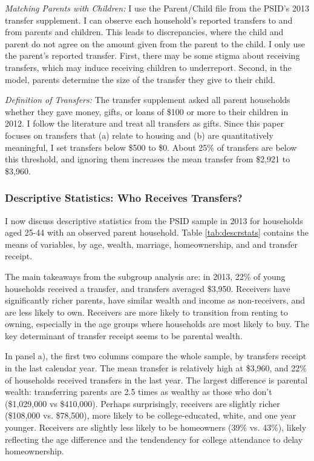\documentclass[12pt]{article}
\begin{document}
\textit{Matching Parents with Children:} I use the Parent/Child file from the PSID's 2013 transfer supplement. I can observe each household's reported transfers to and from parents and children. This leads to discrepancies, where the child and parent do not agree on the amount given from the parent to the child. I only use the parent's reported transfer. First, there may be some stigma about receiving transfers, which may induce receiving children to underreport. Second, in the model, parents determine the size of the transfer they give to their child. 

\textit{Definition of Transfers:} The transfer supplement asked all parent households whether they gave money, gifts, or loans of \$100 or more to their children in 2012. I follow the literature \citep[e.g.,][]{mcgarry2016dynamic} and treat all transfers as gifts. Since this paper focuses on transfers that (a) relate to housing and (b) are quantitatively meaningful, I set transfers below \$500 to \$0. About 25\% of transfers are below this threshold, and ignoring them increases the mean transfer from \$2,921 to \$3,960.

\subsubsection{Descriptive Statistics: Who Receives Transfers?}
I now discuss descriptive statistics from the PSID sample in 2013 for households aged 25-44 with an observed parent household. Table \ref{tab:descrstats} contains the means of variables, by age, wealth, marriage, homeownership, and and transfer receipt.

The main takeaways from the subgroup analysis are: in 2013, 22\% of young households received a transfer, and transfers averaged \$3,950. Receivers have significantly richer parents, have similar wealth and income as non-receivers, and are less likely to own. Receivers are more likely to transition from renting to owning, especially in the age groups where households are most likely to buy. The key determinant of transfer receipt seems to be parental wealth.

In panel a), the first two columns compare the whole sample, by transfers receipt in the last calendar year. The mean transfer is relatively high at \$3,960, and 22\% of households received transfers in the last year. The largest difference is parental wealth: transferring parents are 2.5 times as wealthy as those who don't (\$1,029,000 vs \$410,000). Perhaps surprisingly, receivers are slightly richer (\$108,000 vs. \$78,500), more likely to be college-educated, white, and one year younger. Receivers are slightly less likely to be homeowners (39\% vs. 43\%), likely reflecting the age difference and the tendendency for college attendance to delay homeownership.
\end{document}

